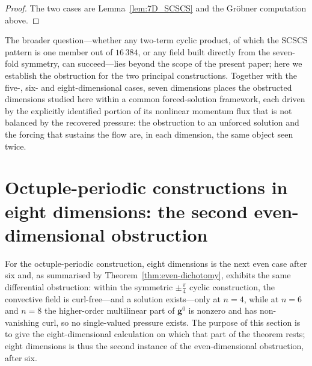 \documentclass[11pt]{jfm}
\numberwithin{equation}{section}
\begin{document}
\begin{proof}
The two cases are Lemma~\ref{lem:7D_SCSCS} and the Gr\"obner computation above.
\end{proof}

\noindent The broader question---whether any two-term cyclic product, of which the SCSCS pattern
is one member out of $16\,384$, or any field built directly from the seven-fold symmetry, can
succeed---lies beyond the scope of the present paper; here we establish the obstruction for the
two principal constructions. Together with the five-, six- and eight-dimensional cases, seven
dimensions places the obstructed dimensions studied here within a common forced-solution
framework, each driven by the explicitly identified portion of its nonlinear momentum flux that is
not balanced by the recovered pressure: the obstruction to an unforced solution and the forcing
that sustains the flow are, in each dimension, the same object seen twice.

\section{Octuple-periodic constructions in eight dimensions:
the second even-dimensional obstruction}
\label{sec:8D}
For the octuple-periodic construction, eight dimensions is the next even case after six and, as summarised by
Theorem~\ref{thm:even-dichotomy}, exhibits the same differential obstruction: within the
symmetric $\pm\tfrac{\pi}{4}$ cyclic construction, the convective field is curl-free---and a
solution exists---only at $n=4$, while at $n=6$ and $n=8$ the higher-order multilinear part of
$\boldsymbol{g}^0$ is nonzero and has non-vanishing curl, so no single-valued pressure exists. The
purpose of this section is to give the eight-dimensional calculation on which that part of the
theorem rests; eight dimensions is thus the second instance of the even-dimensional obstruction,
after six.
\end{document}
